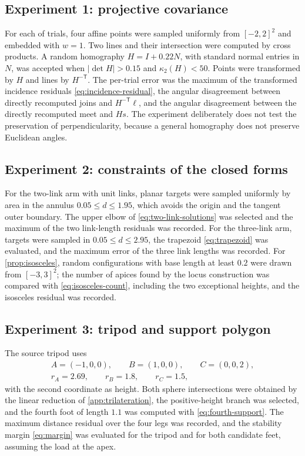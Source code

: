 \documentclass[11pt,a4paper]{article}
\theoremstyle{plain}
\theoremstyle{definition}
\theoremstyle{remark}
\newcommand{\T}{\mathsf{T}}
\newcommand{\abs}[1]{\left\lvert#1\right\rvert}
\begin{document}
\subsection{Experiment 1: projective covariance}

For each of \ProjectiveTrials{} trials, four affine points were sampled
uniformly from $[-2,2]^2$ and embedded with $w=1$. Two lines and their
intersection were computed by cross products. A random homography $H=I+0.22N$,
with standard normal entries in $N$, was accepted when $\abs{\det H}>0.15$ and
$\kappa_2(H)<50$. Points were transformed by $H$ and lines by $H^{-\T}$. The
per-trial error was the maximum of the transformed incidence residuals
\cref{eq:incidence-residual}, the angular disagreement between directly
recomputed joins and $H^{-\T}\ell$, and the angular disagreement between the
directly recomputed meet and $Hs$. The experiment deliberately does not test
the preservation of perpendicularity, because a general homography does not
preserve Euclidean angles.

\subsection{Experiment 2: constraints of the closed forms}

For the two-link arm with unit links, \TwoLinkTrials{} planar targets were
sampled uniformly by area in the annulus $0.05\le d\le1.95$, which avoids the
origin and the tangent outer boundary. The upper elbow of
\cref{eq:two-link-solutions} was selected and the maximum of the two link-length
residuals was recorded. For the three-link arm, \ThreeLinkTrials{} targets were
sampled in $0.05\le d\le2.95$, the trapezoid \cref{eq:trapezoid} was evaluated,
and the maximum error of the three link lengths was recorded. For
\cref{prop:isosceles}, \IsoTrials{} random configurations with base length at
least $0.2$ were drawn from $[-3,3]^2$; the number of apices found by the locus
construction was compared with \cref{eq:isosceles-count}, including the two
exceptional heights, and the isosceles residual was recorded.

\subsection{Experiment 3: tripod and support polygon}

The source tripod uses
\begin{equation}
  \begin{gathered}
    A=(-1,0,0),\qquad B=(1,0,0),\qquad C=(0,0,2),\\
    r_A=2.69,\qquad r_B=1.8,\qquad r_C=1.5,
  \end{gathered}
\end{equation}
with the second coordinate as height. Both sphere intersections were obtained
by the linear reduction of \cref{app:trilateration}, the positive-height branch
was selected, and the fourth foot of length $1.1$ was computed with
\cref{eq:fourth-support}. The maximum distance residual over the four legs was
recorded, and the stability margin \cref{eq:margin} was evaluated for the
tripod and for both candidate feet, assuming the load at the apex.
\end{document}
